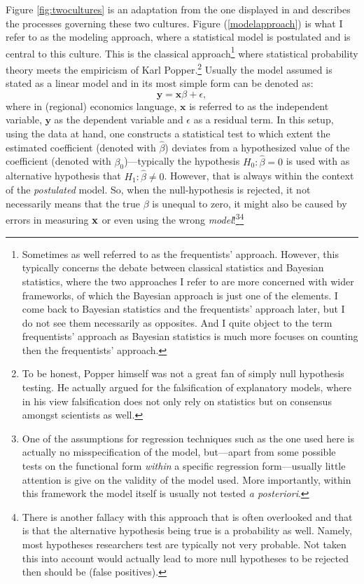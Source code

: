 \documentclass[fleqn,10pt]{SelfArx} %
\begin{document}
Figure \ref{fig:twocultures} is an adaptation from the one displayed in
\citet{breiman2001statistical} and describes the processes governing these two
cultures. Figure (\ref{modelapproach}) is what I refer to as the modeling
approach, where a statistical model is postulated and is central to this
culture. This is the classical approach\footnote{Sometimes as well referred to
  as the frequentists' approach. However, this typically concerns the debate
  between classical statistics and Bayesian statistics, where the two approaches
  I refer to are more concerned with wider frameworks, of which the Bayesian
  approach is just one of the elements. I come back to Bayesian statistics and
  the frequentists' approach later, but I do not see them necessarily as
  opposites. And I quite object to the term frequentists' approach as Bayesian
  statistics is much more focuses on counting then the frequentists' approach.}
  where statistical probability theory
  meets the empiricism of Karl Popper.\footnote{To be honest, Popper himself was not a
  great fan of simply null hypothesis testing. He actually argued for the
  falsification of explanatory models, where in his view falsification does not
  only rely on statistics but on consensus amongst scientists as well.} Usually the model assumed is stated as a linear model and in its most simple form can be denoted as:
\begin{equation}
	\mathbf{y} = \mathbf{x}\beta + \epsilon, 
\end{equation}
where in (regional) economics language, $\mathbf{x}$ is referred to as the
independent variable, $\mathbf{y}$ as the dependent variable and $\epsilon$ as a
residual term. In this setup, using the data at hand, one constructs a
statistical test to which extent the estimated coefficient (denoted with
$\hat{\beta}$) deviates from a hypothesized value of the coefficient (denoted
with $\beta_0$)---typically the hypothesis $H_0: \hat{\beta} = 0$ is used with
as alternative hypothesis that $H_1: \hat{\beta} \neq 0$. However, that is
always within the context of the \textit{postulated} model. So, when the
null-hypothesis is rejected, it not necessarily means that the true $\beta$ is
unequal to zero, it might also be caused by errors in measuring $\bf{x}$ or even
using the wrong \textit{model}!\footnote{One of the assumptions for regression
  techniques such as the one used here is actually no misspecification of the
  model, but---apart from some possible tests on the functional form
  \textit{within} a specific regression form---usually little attention is give
  on the validity of the model used. More importantly, within this framework the
  model itself is usually not tested \textit{a posteriori}.}\footnote{There is
  another fallacy with this approach that is often overlooked and that is that
  the alternative hypothesis being true is a probability as well. Namely,
most hypotheses researchers test are typically not very probable. Not taken this
into account would actually lead to more null hypotheses to be rejected then
should be (false positives).}
\end{document}
